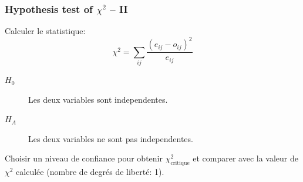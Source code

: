 \documentclass{beamer}
\begin{document}
\begin{frame}
\frametitle{Hypothesis test of $\chi^2$ -- II}

Calculer le statistique:
\[
\chi^2 = \sum_{ij} \frac{(e_{ij}-o_{ij})^2}{e_{ij}}
\]

  \begin{description}
  \item[$H_0$] Les deux variables sont independentes. 
  \item[$H_A$] Les deux variables ne sont pas independentes.
  \end{description}

  Choisir un niveau de confiance pour obtenir $\chi^2_{\text{critique}}$ et comparer avec
  la valeur de $\chi^2$ calculée (nombre de degrés de liberté: 1). 
\end{frame}
\end{document}
